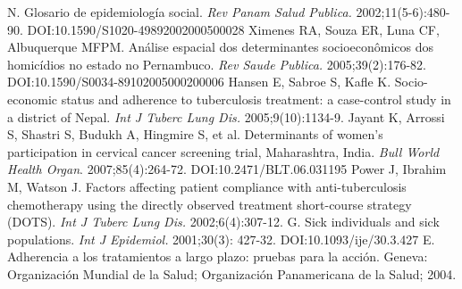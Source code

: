 \begin{multicols}{2}
\begin{biblio}[REFERENCES]
N.\allowbreak{} Glosario de epidemiología social.\allowbreak{} \textit{Rev Panam Salud Publica.\allowbreak{} }2002;11(\allowbreak{}5-\allowbreak{}6)\allowbreak{}:\allowbreak{}480-\allowbreak{}90.\allowbreak{} DOI:\allowbreak{}10.\allowbreak{}1590\fshyp{}S1020-\allowbreak{}49892002000500028
\allowbreak{} Ximenes RA,\allowbreak{} Souza ER,\allowbreak{} Luna CF,\allowbreak{} Albuquerque MFPM.\allowbreak{} Análise espacial dos determinantes socioeconômicos dos homicídios no estado no Pernambuco.\allowbreak{} \textit{Rev Saude Publica.\allowbreak{} }2005;39(\allowbreak{}2)\allowbreak{}:\allowbreak{}176-\allowbreak{}82.\allowbreak{} DOI:\allowbreak{}10.\allowbreak{}1590\fshyp{}S0034-\allowbreak{}89102005000200006
\allowbreak{} Hansen E,\allowbreak{} Sabroe S,\allowbreak{} Kafle K.\allowbreak{} Socio-\allowbreak{}economic status and adherence to tuberculosis treatment:\allowbreak{} a case-\allowbreak{}control study in a district of Nepal.\allowbreak{} \textit{Int J Tuberc Lung Dis.\allowbreak{} }2005;9(\allowbreak{}10)\allowbreak{}:\allowbreak{}1134-\allowbreak{}9.\allowbreak{}
\allowbreak{} Jayant K,\allowbreak{} Arrossi S,\allowbreak{} Shastri S,\allowbreak{} Budukh A,\allowbreak{} Hingmire S,\allowbreak{} et al.\allowbreak{} Determinants of women’s participation in cervical cancer screening trial,\allowbreak{} Maharashtra,\allowbreak{} India.\allowbreak{} \textit{Bull World Health Organ}.\allowbreak{} 2007;85(\allowbreak{}4)\allowbreak{}:\allowbreak{}264-\allowbreak{}72.\allowbreak{} DOI:\allowbreak{}10.\allowbreak{}2471\fshyp{}BLT.\allowbreak{}06.\allowbreak{}031195
\allowbreak{} Power J,\allowbreak{} Ibrahim M,\allowbreak{} Watson J.\allowbreak{} Factors affecting patient compliance with anti-\allowbreak{}tuberculosis chemotherapy using the directly observed treatment short-\allowbreak{}course strategy (\allowbreak{}DOTS)\allowbreak{}.\allowbreak{} \textit{Int J Tuberc Lung Dis.\allowbreak{} }2002;6(\allowbreak{}4)\allowbreak{}:\allowbreak{}307-\allowbreak{}12.\allowbreak{}
G.\allowbreak{} Sick individuals and sick populations.\allowbreak{} \textit{Int J Epidemiol.\allowbreak{} }2001;30(\allowbreak{}3)\allowbreak{}:\allowbreak{} 427-\allowbreak{}32.\allowbreak{} DOI:\allowbreak{}10.\allowbreak{}1093\fshyp{}ije\fshyp{}30.\allowbreak{}3.\allowbreak{}427
E.\allowbreak{} Adherencia a los tratamientos a largo plazo:\allowbreak{} pruebas para la acción.\allowbreak{} Geneva:\allowbreak{} Organización Mundial de la Salud; Organización Panamericana de la Salud; 2004.\allowbreak{}

\end{biblio}
\end{multicols}
